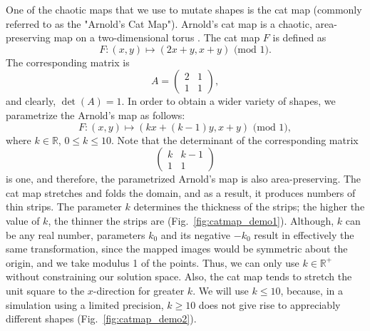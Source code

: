\documentclass[12pt]{reedmcm}
\begin{document}
One of the chaotic maps that we use to mutate shapes is the cat map (commonly referred to as the "Arnold's Cat Map").
Arnold's cat map is a chaotic, area-preserving map on a two-dimensional torus \citep{hilborn}.
The cat map $F$ is defined as
\begin{equation*}
  F: (x,y) \mapsto (2x + y, x + y) \mbox{ (mod 1)}.
\end{equation*}
The corresponding matrix is
\begin{equation*}
A =
\begin{pmatrix}
    2 & 1  \\
    1 & 1  
  \end{pmatrix},
\end{equation*}
and clearly, $\det(A) = 1$.
In order to obtain a wider variety of shapes, we parametrize the Arnold's map as follows:
\begin{equation*}
  F: (x,y) \mapsto (kx + (k-1)y, x + y) \mbox{ (mod 1)},
\end{equation*}
where $k \in \mathbb{R}$, $0 \leq k \leq 10$.
Note that the determinant of the corresponding matrix
\begin{equation*}
\begin{pmatrix}
    k & k-1  \\
    1 & 1  
  \end{pmatrix}
\end{equation*}
is one, and therefore, the parametrized Arnold's map is also area-preserving.
The cat map stretches and folds the domain, and as a result, it produces numbers of thin strips.
The parameter $k$ determines the thickness of the strips;
the higher the value of $k$, the thinner the strips are (Fig.~\ref{fig:catmap_demo1}).
%
Although, $k$ can be any real number, parameters $k_0$ and its negative $-k_0$ result in effectively the same transformation, since the mapped images would be symmetric about the origin, and we take modulus 1 of the points.
Thus, we can only use $k \in \mathbb{R}^+$ without constraining our solution space.
Also, the cat map tends to stretch the unit square to the $x$-direction for greater $k$.
We will use $k \leq 10$, because, in a simulation using a limited precision, $k\geq 10$ does not give rise to appreciably different shapes (Fig.~\ref{fig:catmap_demo2}).
\end{document}
